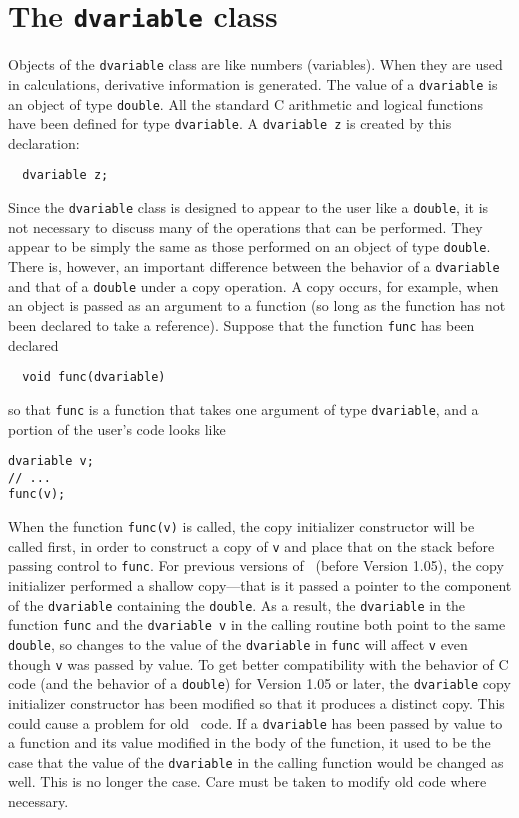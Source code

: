 \documentclass{admbmanual}
\begin{document}
\section{The \texttt{dvariable} class}

Objects of the \texttt{dvariable} class are like numbers (variables). When they
are used in calculations, derivative information is generated. The value of a
\texttt{dvariable} is an object of type \texttt{double}. All the standard C
arithmetic and logical functions have been defined for type \texttt{dvariable}.
A \texttt{dvariable~z} is created by this declaration:
\begin{lstlisting}
  dvariable z;
\end{lstlisting}

Since the \texttt{dvariable} class is designed to appear to the user like a
\texttt{double}, it is not necessary to discuss many of the operations that can
be performed. They appear to be simply the same as those performed on an object
of type \texttt{double}. There is, however, an important difference between the
behavior of a \texttt{dvariable} and that of a \texttt{double} under a copy
operation. A copy occurs, for example, when an object is passed as an argument
to a function (so long as the function has not been declared to take a
reference). Suppose that the function \texttt{func} has been declared
\begin{lstlisting}
  void func(dvariable)
\end{lstlisting}
so that \texttt{func} is a function that takes one argument of type
\texttt{dvariable}, and a portion of the user's code looks like
\begin{lstlisting}
dvariable v;
// ...
func(v);
\end{lstlisting}

When the function \texttt{func(v)} is called, the copy initializer constructor
will be called first, in order to construct a copy of \texttt{v} and place that
on the stack before passing control to \texttt{func}. For previous versions of
\scAD\ (before Version 1.05), the copy initializer performed a shallow
copy---that is it passed a pointer to the component of the \texttt{dvariable}
containing the \texttt{double}. As a result, the \texttt{dvariable} in the
function \texttt{func} and the \texttt{dvariable v} in the calling routine both
point to the same \texttt{double}, so changes to the value of the
\texttt{dvariable} in \texttt{func} will affect \texttt{v} even though
\texttt{v} was passed by value. To get better compatibility with the behavior of
C code (and the behavior of a \texttt{double}) for Version 1.05 or later, the
\texttt{dvariable} copy initializer constructor has been modified so that it
produces a distinct copy. This could cause a problem for old \scAD\ code. If a
\texttt{dvariable} has been passed by value to a function and its value modified
in the body of the function, it used to be the case that the value of the
\texttt{dvariable} in the calling function would be changed as well. This is no
longer the case. Care must be taken to modify old code where necessary.
\end{document}
